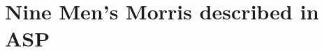 \documentclass[12pt,twoside]{report}
\begin{document}

\cite{5FF_rules}
\cite{9MM_rules}
\cite{asalto_rules}




\appendix


\chapter{Nine Men's Morris described in ASP}

\end{document}
